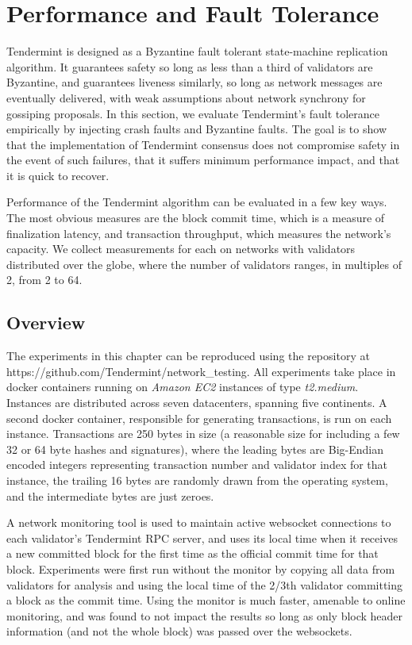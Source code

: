 \chapter{Performance and Fault Tolerance}
\label{ch:performance}

Tendermint is designed as a Byzantine fault tolerant state-machine replication algorithm.
It guarantees safety so long as less than a third of validators are Byzantine, 
and guarantees liveness similarly, so long as network messages are eventually delivered,
with weak assumptions about network synchrony for gossiping proposals.
In this section, we evaluate Tendermint's fault tolerance empirically by injecting 
crash faults and Byzantine faults.
The goal is to show that the implementation of Tendermint consensus does not compromise safety in the event of such failures,
that it suffers minimum performance impact, and that it is quick to recover.

Performance of the Tendermint algorithm can be evaluated in a few key ways.
The most obvious measures are the block commit time, which is a measure of finalization latency, 
and transaction throughput, which measures the network's capacity.
We collect measurements for each on networks with validators distributed over the globe, 
where the number of validators ranges, in multiples of 2, from 2 to 64.

\section{Overview}

The experiments in this chapter can be reproduced using the repository at https://github.com/Tendermint/network\_testing.
All experiments take place in docker containers running on \emph{Amazon EC2} instances of type \emph{t2.medium}.
Instances are distributed across seven datacenters, spanning five continents.
A second docker container, responsible for generating transactions, is run on each instance.
Transactions are 250 bytes in size (a reasonable size for including a few 32 or 64 byte hashes and signatures),
where the leading bytes are Big-Endian encoded integers representing transaction number and validator index for that instance,
the trailing 16 bytes are randomly drawn from the operating system, and the intermediate bytes are just zeroes.

A network monitoring tool is used to maintain active websocket connections to each validator's Tendermint RPC server,
and uses its local time when it receives a new committed block for the first time as the official commit time for that block.
Experiments were first run without the monitor by copying all data from validators for analysis and using the local time
of the 2/3th validator committing a block as the commit time. 
Using the monitor is much faster, amenable to online monitoring, and was found to not impact the results 
so long as only block header information (and not the whole block) was passed over the websockets.

